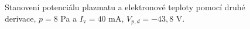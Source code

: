 \documentclass[a4paper,12pt]{article}
\begin{document}
\begin{figure}[h!]
	\centering
	\begin{subfigure}[b]{.49\textwidth}
		\centering
	\end{subfigure}
	\begin{subfigure}[b]{.49\textwidth}
		\centering
	\end{subfigure}
	\caption{Stanovení potenciálu plazmatu a elektronové teploty pomocí druhé 
	derivace, $p = 8$ 
	\si{\pascal} a $I_\text{v} = 40$ \si{\milli\ampere}, $V_{p,d} = 
	-43,8$ \si{\volt}.}
	\label{data7sec}
\end{figure}
\end{document}
